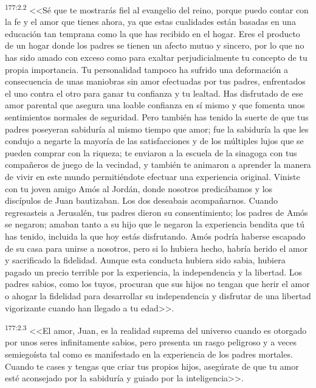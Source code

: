 \par 
\textsuperscript{177:2.2} <<Sé que te mostrarás fiel al evangelio del reino, porque puedo contar con la fe y el amor que tienes ahora, ya que estas cualidades están basadas en una educación tan temprana como la que has recibido en el hogar. Eres el producto de un hogar donde los padres se tienen un afecto mutuo y sincero, por lo que no has sido amado con exceso como para exaltar perjudicialmente tu concepto de tu propia importancia. Tu personalidad tampoco ha sufrido una deformación a consecuencia de unas maniobras sin amor efectuadas por tus padres, enfrentados el uno contra el otro para ganar tu confianza y tu lealtad. Has disfrutado de ese amor parental que asegura una loable confianza en sí mismo y que fomenta unos sentimientos normales de seguridad. Pero también has tenido la suerte de que tus padres poseyeran sabiduría al mismo tiempo que amor; fue la sabiduría la que les condujo a negarte la mayoría de las satisfacciones y de los múltiples lujos que se pueden comprar con la riqueza; te enviaron a la escuela de la sinagoga con tus compañeros de juego de la vecindad, y también te animaron a aprender la manera de vivir en este mundo permitiéndote efectuar una experiencia original. Viniste con tu joven amigo Amós al Jordán, donde nosotros predicábamos y los discípulos de Juan bautizaban. Los dos deseabais acompañarnos. Cuando regresasteis a Jerusalén, tus padres dieron su consentimiento; los padres de Amós se negaron; amaban tanto a su hijo que le negaron la experiencia bendita que tú has tenido, incluida la que hoy estás disfrutando. Amós podría haberse escapado de su casa para unirse a nosotros, pero si lo hubiera hecho, habría herido el amor y sacrificado la fidelidad. Aunque esta conducta hubiera sido sabia, hubiera pagado un precio terrible por la experiencia, la independencia y la libertad. Los padres sabios, como los tuyos, procuran que sus hijos no tengan que herir el amor o ahogar la fidelidad para desarrollar su independencia y disfrutar de una libertad vigorizante cuando han llegado a tu edad>>.

\par 
\textsuperscript{177:2.3} <<El amor, Juan, es la realidad suprema del universo cuando es otorgado por unos seres infinitamente sabios, pero presenta un rasgo peligroso y a veces semiegoísta tal como es manifestado en la experiencia de los padres mortales. Cuando te cases y tengas que criar tus propios hijos, asegúrate de que tu amor esté aconsejado por la sabiduría y guiado por la inteligencia>>.

